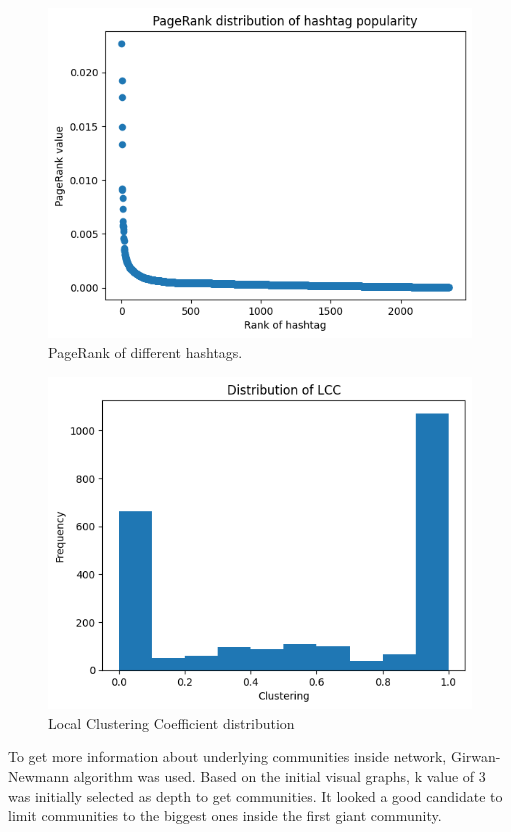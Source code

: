 \documentclass[conference]{IEEEtran}
\begin{document}
    \begin{figure}
        \includegraphics[scale=0.6]{figures/pagerank_distribution}
        \caption{PageRank of different hashtags.}
        \label{fig:pagerank}
    \end{figure}

    \begin{figure}
        \includegraphics[scale=0.6]{figures/lcc_distribution}
        \caption{Local Clustering Coefficient distribution}
        \label{fig:lcc}
    \end{figure}

    To get more information about underlying communities inside network, Girwan-Newmann algorithm was used.
    Based on the initial visual graphs, k value of 3 was initially selected as depth to get communities.
    It looked a good candidate to limit communities to the biggest ones inside the first giant community.
\end{document}
